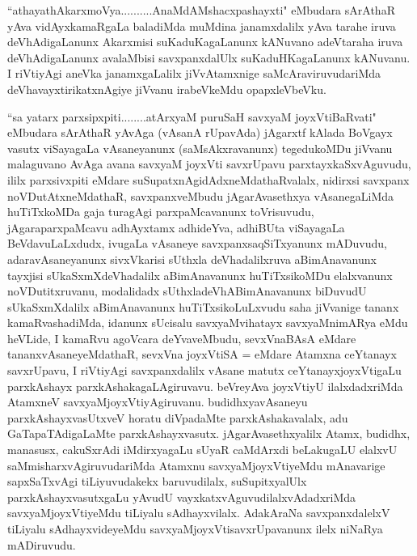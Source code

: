 
\begin{artha}
``athayathAkarxmoVya..........AnaMdAMshacxpashayxti" eMbudara sArAthaR yAva vidAyxkamaRgaLa baladiMda muMdina janamxdalilx yAva tarahe iruva deVhAdigaLanunx Akarxmisi suKaduKagaLanunx kANuvano adeVtaraha iruva deVhAdigaLanunx avalaMbisi savxpanxdalUlx suKaduHKagaLanunx kANuvanu. I riVtiyAgi aneVka janamxgaLalilx jiVvAtamxnige saMcAraviruvudariMda deVhavayxtirikatxnAgiye jiVvanu irabeVkeMdu opapxleVbeVku.
\end{artha}


\begin{artha}
``sa yatarx parxsipxpiti........atArxyaM puruSaH savxyaM joyxVtiBaRvati" eMbudara sArAthaR yAvAga (vAsanA rUpavAda) jAgarxtf kAlada BoVgayx vasutx viSayagaLa vAsaneyanunx (saMsAkxravanunx) tegedukoMDu jiVvanu malaguvano AvAga avana savxyaM joyxVti savxrUpavu parxtayxkaSxvAguvudu, ililx parxsivxpiti eMdare suSupatxnAgidAdxneMdathaRvalalx, nidirxsi savxpanx noVDutAtxneMdathaR, savxpanxveMbudu jAgarAvasethxya vAsanegaLiMda huTiTxkoMDa gaja turagAgi parxpaMcavanunx toVrisuvudu, jAgaraparxpaMcavu adhAyxtamx adhideYva, adhiBUta viSayagaLa BeVdavuLaLxdudx, ivugaLa vAsaneye savxpanxsaqSiTxyanunx mADuvudu, adaravAsaneyanunx sivxVkarisi sUthxla deVhadalilxruva aBimAnavanunx tayxjisi sUkaSxmXdeVhadalilx aBimAnavanunx huTiTxsikoMDu elalxvanunx noVDutitxruvanu, modalidadx sUthxladeVhABimAnavanunx biDuvudU sUkaSxmXdalilx aBimAnavanunx huTiTxsikoLuLxvudu saha jiVvanige tananx kamaRvashadiMda, idanunx sUcisalu savxyaMvihatayx savxyaMnimARya eMdu heVLide, I kamaRvu agoVcara deYvaveMbudu, sevxVnaBAsA eMdare tananxvAsaneyeMdathaR, sevxVna joyxVtiSA = eMdare Atamxna ceYtanayx savxrUpavu, I riVtiyAgi savxpanxdalilx vAsane matutx ceYtanayxjoyxVtigaLu parxkAshayx parxkAshakagaLAgiruvavu. beVreyAva joyxVtiyU ilalxdadxriMda AtamxneV savxyaMjoyxVtiyAgiruvanu. budidhxyavAsaneyu parxkAshayxvasUtxveV horatu diVpadaMte parxkAshakavalalx, adu GaTapaTAdigaLaMte parxkAshayxvasutx. jAgarAvasethxyalilx Atamx, budidhx, manasusx, cakuSxrAdi iMdirxyagaLu sUyaR caMdArxdi beLakugaLU elalxvU saMmisharxvAgiruvudariMda Atamxnu savxyaMjoyxVtiyeMdu mAnavarige sapxSaTxvAgi tiLiyuvudakekx baruvudilalx, suSupitxyalUlx parxkAshayxvasutxgaLu yAvudU vayxkatxvAguvudilalxvAdadxriMda savxyaMjoyxVtiyeMdu tiLiyalu sAdhayxvilalx. AdakAraNa savxpanxdalelxV tiLiyalu sAdhayxvideyeMdu savxyaMjoyxVtisavxrUpavanunx ilelx niNaRya mADiruvudu.
\end{artha}%

